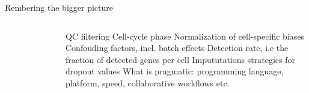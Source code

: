 \documentclass{beamer}\usepackage[]{graphicx}\usepackage[]{color}
\begin{document}
\begin{frame}
\begin{block}{Rembering the bigger picture}

\begin{columns}
\begin{center}
\begin{figure}
\includegraphics[height=6cm]{Images/Stegle-2015-workflow}
\caption{\cite{Stegle2015}}
\end{figure}
\end{center}


\scriptsize
QC filtering \newline \newline
Cell-cycle phase \newline \newline
Normalization of cell-specific biases \newline \newline
Confouding factors, incl. batch effects \newline \newline
Detection rate, i.e the fraction of detected genes per cell \newline \newline
Impututations strategies for dropout values  \newline \newline \newline
What is pragmatic: programming language, platform, speed, collaborative workflows etc.
\end{columns}
\end{block}
\end{frame}
\end{document}
